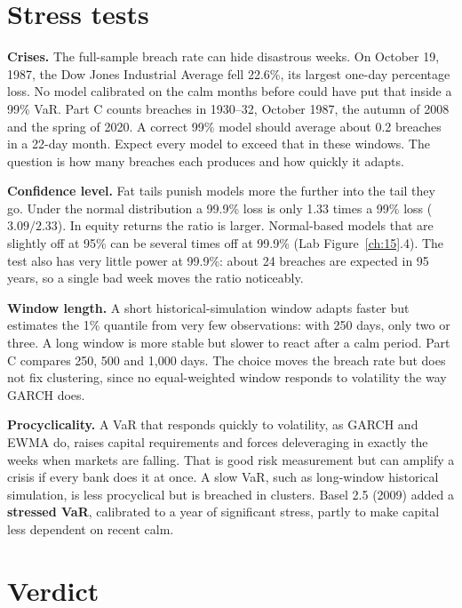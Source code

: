\section{Stress tests}
\label{sec:15-stress}

\textbf{Crises.} The full-sample breach rate can hide disastrous weeks. On October 19, 1987, the Dow Jones Industrial Average fell 22.6\%, its largest one-day percentage loss. No model calibrated on the calm months before could have put that inside a 99\% VaR. Part C counts breaches in 1930--32, October 1987, the autumn of 2008 and the spring of 2020. A correct 99\% model should average about 0.2 breaches in a 22-day month. Expect every model to exceed that in these windows. The question is how many breaches each produces and how quickly it adapts.

\textbf{Confidence level.} Fat tails punish models more the further into the tail they go. Under the normal distribution a 99.9\% loss is only 1.33 times a 99\% loss ($3.09/2.33$). In equity returns the ratio is larger. Normal-based models that are slightly off at 95\% can be several times off at 99.9\% (Lab Figure~\ref{ch:15}.4). The test also has very little power at 99.9\%: about 24 breaches are expected in 95 years, so a single bad week moves the ratio noticeably.

\textbf{Window length.} A short historical-simulation window adapts faster but estimates the 1\% quantile from very few observations: with 250 days, only two or three. A long window is more stable but slower to react after a calm period. Part C compares 250, 500 and 1,000 days. The choice moves the breach rate but does not fix clustering, since no equal-weighted window responds to volatility the way GARCH does.

\textbf{Procyclicality.} A VaR that responds quickly to volatility, as GARCH and EWMA do, raises capital requirements and forces deleveraging in exactly the weeks when markets are falling. That is good risk measurement but can amplify a crisis if every bank does it at once. A slow VaR, such as long-window historical simulation, is less procyclical but is breached in clusters. Basel 2.5 (2009) added a \textbf{stressed VaR}, calibrated to a year of significant stress, partly to make capital less dependent on recent calm.

\section{Verdict}
\label{sec:15-verdict}

